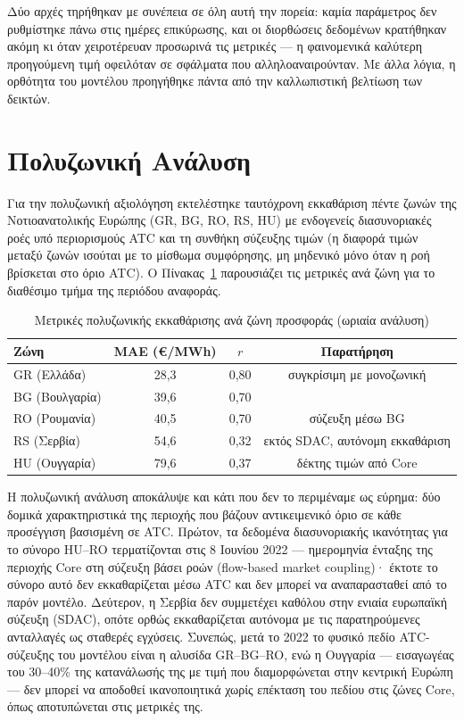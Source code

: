 Δύο αρχές τηρήθηκαν με συνέπεια σε όλη αυτή την πορεία: καμία παράμετρος δεν ρυθμίστηκε πάνω στις ημέρες επικύρωσης, και οι διορθώσεις δεδομένων κρατήθηκαν ακόμη κι όταν χειροτέρευαν προσωρινά τις μετρικές --- η φαινομενικά καλύτερη προηγούμενη τιμή οφειλόταν σε σφάλματα που αλληλοαναιρούνταν. Με άλλα λόγια, η ορθότητα του μοντέλου προηγήθηκε πάντα από την καλλωπιστική βελτίωση των δεικτών.


\section{Πολυζωνική Ανάλυση}
\label{sec:multizone-results}

Για την πολυζωνική αξιολόγηση εκτελέστηκε ταυτόχρονη εκκαθάριση πέντε ζωνών της Νοτιοανατολικής Ευρώπης (GR, BG, RO, RS, HU) με ενδογενείς διασυνοριακές ροές υπό περιορισμούς ATC και τη συνθήκη σύζευξης τιμών (η διαφορά τιμών μεταξύ ζωνών ισούται με το μίσθωμα συμφόρησης, μη μηδενικό μόνο όταν η ροή βρίσκεται στο όριο ATC). Ο Πίνακας~\ref{tab:multizone-metrics} παρουσιάζει τις μετρικές ανά ζώνη για το διαθέσιμο τμήμα της περιόδου αναφοράς.

\begin{table}[htbp]
\centering
\caption{Μετρικές πολυζωνικής εκκαθάρισης ανά ζώνη προσφοράς (ωριαία ανάλυση)}
\label{tab:multizone-metrics}
\begin{tabular}{@{}lccc@{}}
\toprule
\textbf{Ζώνη} & \textbf{MAE (€/MWh)} & \textbf{$r$} & \textbf{Παρατήρηση} \\
\midrule
GR (Ελλάδα) & 28,3 & 0,80 & συγκρίσιμη με μονοζωνική \\
BG (Βουλγαρία) & 39,6 & 0,70 & \\
RO (Ρουμανία) & 40,5 & 0,70 & σύζευξη μέσω BG \\
RS (Σερβία) & 54,6 & 0,32 & εκτός SDAC, αυτόνομη εκκαθάριση \\
HU (Ουγγαρία) & 79,6 & 0,37 & δέκτης τιμών από Core \\
\bottomrule
\end{tabular}
\end{table}

Η πολυζωνική ανάλυση αποκάλυψε και κάτι που δεν το περιμέναμε ως εύρημα: δύο δομικά χαρακτηριστικά της περιοχής που βάζουν αντικειμενικό όριο σε κάθε προσέγγιση βασισμένη σε ATC. Πρώτον, τα δεδομένα διασυνοριακής ικανότητας για το σύνορο HU--RO τερματίζονται στις 8 Ιουνίου 2022 --- ημερομηνία ένταξης της περιοχής Core στη σύζευξη βάσει ροών (flow-based market coupling)· έκτοτε το σύνορο αυτό δεν εκκαθαρίζεται μέσω ATC και δεν μπορεί να αναπαρασταθεί από το παρόν μοντέλο. Δεύτερον, η Σερβία δεν συμμετέχει καθόλου στην ενιαία ευρωπαϊκή σύζευξη (SDAC), οπότε ορθώς εκκαθαρίζεται αυτόνομα με τις παρατηρούμενες ανταλλαγές ως σταθερές εγχύσεις. Συνεπώς, μετά το 2022 το φυσικό πεδίο ATC-σύζευξης του μοντέλου είναι η αλυσίδα GR--BG--RO, ενώ η Ουγγαρία --- εισαγωγέας του 30--40\% της κατανάλωσής της με τιμή που διαμορφώνεται στην κεντρική Ευρώπη --- δεν μπορεί να αποδοθεί ικανοποιητικά χωρίς επέκταση του πεδίου στις ζώνες Core, όπως αποτυπώνεται στις μετρικές της.

